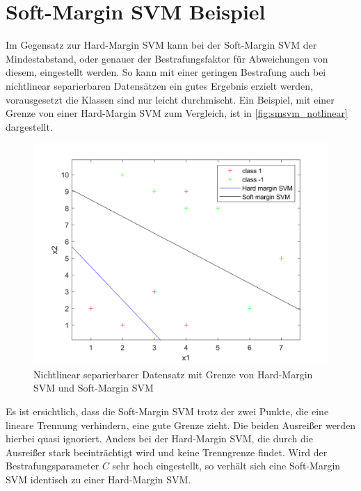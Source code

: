 \documentclass[a4paper,11pt,twoside]{scrreprt}
\begin{document}
\section{Soft-Margin SVM Beispiel}\label{sec:smscmbsp}
Im Gegensatz zur Hard-Margin \ac{SVM} kann bei der Soft-Margin \ac{SVM} der Mindestabstand, oder genauer der Bestrafungsfaktor für Abweichungen von diesem, eingestellt werden.
So kann mit einer geringen Bestrafung auch bei nichtlinear separierbaren Datensätzen ein gutes Ergebnis erzielt werden, vorausgesetzt die Klassen sind nur leicht durchmischt.
Ein Beispiel, mit einer Grenze von einer Hard-Margin SVM zum Vergleich, ist in \autoref{fig:smsvm_notlinear} dargestellt.
\begin{figure}[H]
    \centering
    \includegraphics[width = 16cm]{../code/octave/images/svmsimplenotlinear}
    \caption{Nichtlinear separierbarer Datensatz mit Grenze von Hard-Margin \ac{SVM} und Soft-Margin \ac{SVM}}
    \label{fig:smsvm_notlinear}
\end{figure}
Es ist ersichtlich, dass die Soft-Margin \ac{SVM} trotz der zwei Punkte, die eine lineare Trennung verhindern, eine gute Grenze zieht.
Die beiden Ausreißer werden hierbei quasi ignoriert.
Anders bei der Hard-Margin SVM, die durch die Ausreißer stark beeinträchtigt wird und keine Trenngrenze findet.
Wird der Bestrafungsparameter $C$ sehr hoch eingestellt, so verhält sich eine Soft-Margin \ac{SVM} identisch zu einer Hard-Margin \ac{SVM}.
\end{document}
